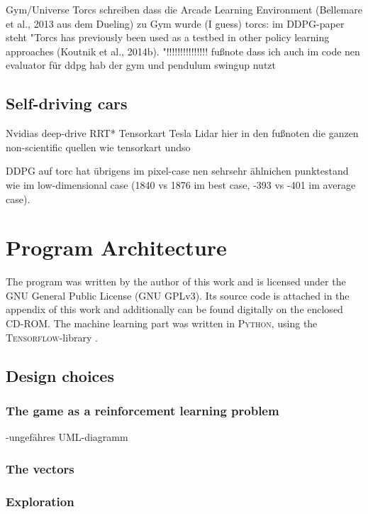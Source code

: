 Gym/Universe
Torcs
schreiben dass die Arcade Learning Environment (Bellemare et al., 2013 aus dem Dueling) zu Gym wurde (I guess)
torcs: im DDPG-paper steht "Torcs has previously been used as a testbed in other
policy learning approaches (Koutnik et al., 2014b). "!!!!!!!!!!!!!!!
fußnote dass ich auch im code nen evaluator für ddpg hab der gym und pendulum swingup nutzt

\section{Self-driving cars}

Nvidias deep-drive
RRT*
Tensorkart
Tesla
Lidar
hier in den fußnoten die ganzen non-scientific quellen wie tensorkart undso

DDPG auf torc hat übrigens im pixel-case nen sehrsehr ählnichen punktestand wie im low-dimensional case (1840 vs 1876 im best case, -393 vs -401 im average case).


\chapter{Program Architecture}


The program was written by the author of this work and is licensed under the GNU General Public License (GNU GPLv3). Its source code is attached in the appendix of this work and additionally can be found digitally on the enclosed CD-ROM. The machine learning part was written in \textsc{Python}, using the \textsc{Tensorflow}-library \parencite{abadi_tensorflow:_2015}.

\section{Design choices}

\subsection{The game as a reinforcement learning problem}

-ungefähres UML-diagramm

\subsection{The vectors}

\subsection{Exploration}

